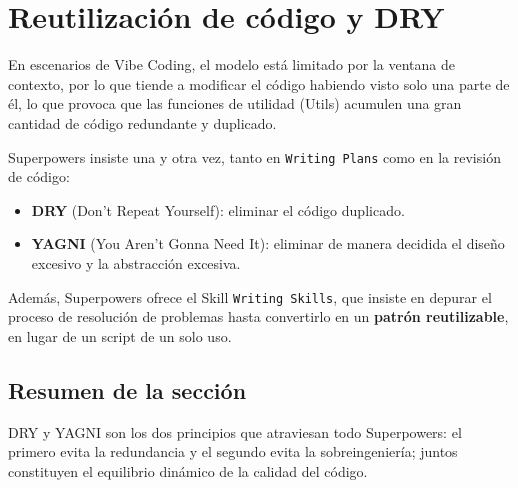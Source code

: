 \section{Reutilización de código y DRY}

En escenarios de Vibe Coding, el modelo está limitado por la ventana de contexto, por lo que tiende a modificar el código habiendo visto solo una parte de él, lo que provoca que las funciones de utilidad (Utils) acumulen una gran cantidad de código redundante y duplicado.

Superpowers insiste una y otra vez, tanto en \texttt{Writing Plans} como en la revisión de código:

\begin{itemize}
    \item \textbf{DRY} (Don't Repeat Yourself): eliminar el código duplicado.
    \item \textbf{YAGNI} (You Aren't Gonna Need It): eliminar de manera decidida el diseño excesivo y la abstracción excesiva.
\end{itemize}

Además, Superpowers ofrece el Skill \texttt{Writing Skills}, que insiste en depurar el proceso de resolución de problemas hasta convertirlo en un \textbf{patrón reutilizable}, en lugar de un script de un solo uso.

\subsection{Resumen de la sección}

DRY y YAGNI son los dos principios que atraviesan todo Superpowers: el primero evita la redundancia y el segundo evita la sobreingeniería; juntos constituyen el equilibrio dinámico de la calidad del código.

